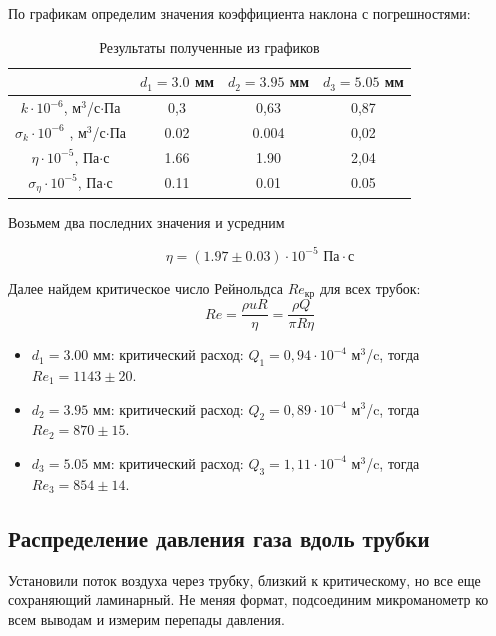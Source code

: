 \documentclass[a4paper, 12pt]{article}
\begin{document}
	По графикам определим значения коэффициента наклона с погрешностями:

	\begin{table}[!ht]
		\begin{center}
		\bgroup
		\def\arraystretch{1.1}%
			\begin{tabular}{|c|c|c|c|}
				\hline
				&$d_1 = 3.0$ мм&$d_2 = 3.95$ мм&$d_3 = 5.05$ мм\\ \hline
				$k\cdot10^{-6}$, $\text{м}^3$/с$\cdot$Па& 0,3 & 0,63 & 0,87\\ \hline
				$\sigma_k \cdot10^{-6} $ , $\text{м}^3$/с$\cdot$Па& 0.02 & 0.004 & 0,02 \\ \hline
				$\eta\cdot10^{-5}$, Па$\cdot$с&1.66&1.90&2,04 \\ \hline
				$\sigma_\eta\cdot10^{-5}$, Па$\cdot$с&0.11&0.01&0.05\\ \hline
			\end{tabular}
		\egroup
		\caption{Результаты полученные из графиков}
		\end{center}
	\end{table}
    Возьмем два последних значения и усредним
	
    \begin{equation*}
		\eta = (1.97\pm 0.03) \cdot 10^{-5} \text{ Па}\cdot \text{с}
	\end{equation*} 
	
	Далее найдем критическое число Рейнольдса $Re_\text{кр}$ для всех трубок:
	\begin{equation*}
		Re = \frac{\rho u R}{\eta} = \frac{\rho Q}{\pi R \eta}
	\end{equation*}
	\begin{itemize}
		\item $d_1 = 3.00$ мм: критический расход: $Q_1 = 0,94\cdot10^{-4}\text{ м}^3$/c, тогда $Re_1 = 1143 \pm 20.$
		\item $d_2 = 3.95$ мм: критический расход: $Q_2 = 0,89\cdot10^{-4}\text{ м}^3$/c, тогда $Re_2 = 870 \pm 15.$  
		\item $d_3 = 5.05$ мм: критический расход: $Q_3 = 1,11\cdot10^{-4}\text{ м}^3$/c, тогда $Re_3 =  854\pm 14.$ 
	\end{itemize}

    \subsection*{Распределение давления газа вдоль трубки}

    Установили поток воздуха через трубку, близкий к критическому, но все еще сохраняющий ламинарный. Не меняя формат, подсоединим микроманометр ко всем выводам и измерим перепады давления. 
\end{document}
